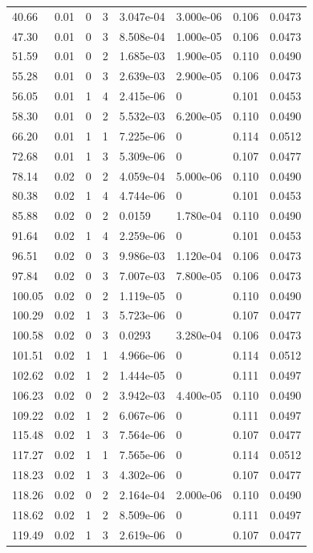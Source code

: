 \documentclass[preview]{standalone}
\begin{document}
{{\begin{tabular}{L{1.2cm}C{1.2cm} C{0.3cm}C{0.5cm} C{1.4cm}C{1.4cm} C{1.4cm}C{1.4cm}}
  40.66  &  0.01  & 0     &  3 &  3.047e-04  & 3.000e-06  & 0.106 &  0.0473   \\ 
  47.30  &  0.01  & 0     &  3 &  8.508e-04  & 1.000e-05  & 0.106 &  0.0473   \\ 
  51.59  &  0.01  & 0     &  2 &  1.685e-03  & 1.900e-05  & 0.110 &  0.0490   \\ 
  55.28  &  0.01  & 0     &  3 &  2.639e-03  & 2.900e-05  & 0.106 &  0.0473   \\ 
  56.05  &  0.01  & 1     &  4 &  2.415e-06  & 0  & 0.101 &  0.0453   \\ 
  58.30  &  0.01  & 0     &  2 &  5.532e-03  & 6.200e-05  & 0.110 &  0.0490   \\ 
  66.20  &  0.01  & 1     &  1 &  7.225e-06  & 0  & 0.114 &  0.0512   \\ 
  72.68  &  0.01  & 1     &  3 &  5.309e-06  & 0  & 0.107 &  0.0477   \\ 
  78.14  &  0.02  & 0     &  2 &  4.059e-04  & 5.000e-06  & 0.110 &  0.0490   \\ 
  80.38  &  0.02  & 1     &  4 &  4.744e-06  & 0  & 0.101 &  0.0453   \\ 
  85.88  &  0.02  & 0     &  2 &  0.0159  & 1.780e-04  & 0.110 &  0.0490   \\ 
  91.64  &  0.02  & 1     &  4 &  2.259e-06  & 0  & 0.101 &  0.0453   \\ 
  96.51  &  0.02  & 0     &  3 &  9.986e-03  & 1.120e-04  & 0.106 &  0.0473   \\ 
  97.84  &  0.02  & 0     &  3 &  7.007e-03  & 7.800e-05  & 0.106 &  0.0473   \\ 
  100.05  &  0.02  & 0     &  2 &  1.119e-05  & 0  & 0.110 &  0.0490   \\ 
  100.29  &  0.02  & 1     &  3 &  5.723e-06  & 0  & 0.107 &  0.0477   \\ 
  100.58  &  0.02  & 0     &  3 &  0.0293  & 3.280e-04  & 0.106 &  0.0473   \\ 
  101.51  &  0.02  & 1     &  1 &  4.966e-06  & 0  & 0.114 &  0.0512   \\ 
  102.62  &  0.02  & 1     &  2 &  1.444e-05  & 0  & 0.111 &  0.0497   \\ 
  106.23  &  0.02  & 0     &  2 &  3.942e-03  & 4.400e-05  & 0.110 &  0.0490   \\ 
  109.22  &  0.02  & 1     &  2 &  6.067e-06  & 0  & 0.111 &  0.0497   \\ 
  115.48  &  0.02  & 1     &  3 &  7.564e-06  & 0  & 0.107 &  0.0477   \\ 
  117.27  &  0.02  & 1     &  1 &  7.565e-06  & 0  & 0.114 &  0.0512   \\ 
  118.23  &  0.02  & 1     &  3 &  4.302e-06  & 0  & 0.107 &  0.0477   \\ 
  118.26  &  0.02  & 0     &  2 &  2.164e-04  & 2.000e-06  & 0.110 &  0.0490   \\ 
  118.62  &  0.02  & 1     &  2 &  8.509e-06  & 0  & 0.111 &  0.0497   \\ 
  119.49  &  0.02  & 1     &  3 &  2.619e-06  & 0  & 0.107 &  0.0477   \\ 
\hline 
\end{tabular} 

}}
\end{document}
